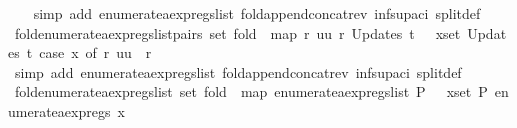 \begin{isabellebody}
%
\isadelimproof
\ \ %
\endisadelimproof
%
\isatagproof
{}\isamarkupfalse%
\ {\isacharparenleft}simp\ add{\isacharcolon}\ enumerate{\isacharunderscore}aexp{\isacharunderscore}regs{\isacharunderscore}list\ fold{\isacharunderscore}append{\isacharunderscore}concat{\isacharunderscore}rev\ inf{\isacharunderscore}sup{\isacharunderscore}aci{\isacharparenleft}{}{\isacharparenright}\ split{\isacharunderscore}def{\isacharparenright}%
\endisatagproof
{\isafoldproof}%
%
\isadelimproof
\isanewline
%
\endisadelimproof
\isanewline
{}\isamarkupfalse%
\ fold{\isacharunderscore}enumerate{\isacharunderscore}aexp{\isacharunderscore}regs{\isacharunderscore}list{\isacharunderscore}pairs{\isacharunderscore}{}{\isacharcolon}\ {\isachardoublequoteopen}set\ {\isacharparenleft}fold\ {\isacharparenleft}{\isacharat}{\isacharparenright}\ {\isacharparenleft}map\ {\isacharparenleft}{\isasymlambda}{\isacharparenleft}r{\isacharcomma}\ uu{\isacharparenright}{\isachardot}\ {\isacharbrackleft}r{\isacharbrackright}{\isacharparenright}\ {\isacharparenleft}Updates\ t{\isacharparenright}{\isacharparenright}\ {\isacharbrackleft}{\isacharbrackright}{\isacharparenright}\ {\isacharequal}\ {\isacharparenleft}{\isasymUnion}x{\isasymin}set\ {\isacharparenleft}Updates\ t{\isacharparenright}{\isachardot}\ case\ x\ of\ {\isacharparenleft}r{\isacharcomma}\ uu{\isacharparenright}\ {\isasymRightarrow}\ {\isacharbraceleft}r{\isacharbraceright}{\isacharparenright}{\isachardoublequoteclose}\isanewline
%
\isadelimproof
\ \ \ \ %
\endisadelimproof
%
\isatagproof
{}\isamarkupfalse%
\ {\isacharparenleft}simp\ add{\isacharcolon}\ enumerate{\isacharunderscore}aexp{\isacharunderscore}regs{\isacharunderscore}list\ fold{\isacharunderscore}append{\isacharunderscore}concat{\isacharunderscore}rev\ inf{\isacharunderscore}sup{\isacharunderscore}aci{\isacharparenleft}{}{\isacharparenright}\ split{\isacharunderscore}def{\isacharparenright}%
\endisatagproof
{\isafoldproof}%
%
\isadelimproof
\isanewline
%
\endisadelimproof
\isanewline
{}\isamarkupfalse%
\ fold{\isacharunderscore}enumerate{\isacharunderscore}aexp{\isacharunderscore}regs{\isacharunderscore}list{\isacharcolon}\ {\isachardoublequoteopen}set\ {\isacharparenleft}fold\ {\isacharparenleft}{\isacharat}{\isacharparenright}\ {\isacharparenleft}map\ enumerate{\isacharunderscore}aexp{\isacharunderscore}regs{\isacharunderscore}list\ P{\isacharparenright}\ {\isacharbrackleft}{\isacharbrackright}{\isacharparenright}\ {\isacharequal}\ {\isacharparenleft}{\isasymUnion}x{\isasymin}set\ P{\isachardot}\ enumerate{\isacharunderscore}aexp{\isacharunderscore}regs\ x{\isacharparenright}{\isachardoublequoteclose}\isanewline

\end{isabellebody}
